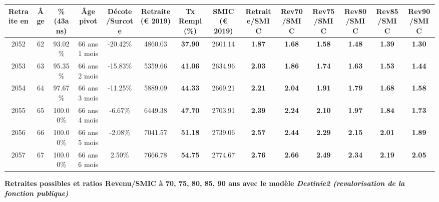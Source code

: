 \begin{adjustbox}{max width=\textwidth} 
\begin{tabular}[htb]{|c|c||c|c|c||c|c||c||c|c|c|c|c|c|} 
\hline 
 Retraite en &  Âge &  \%(43ans) &  Âge pivot &  Décote/Surcote &  Retraite (\euro{} 2019) &  Tx Rempl(\%) &  SMIC (\euro{} 2019) &  Retraite/SMIC &  Rev70/SMIC &  Rev75/SMIC &  Rev80/SMIC &  Rev85/SMIC &  Rev90/SMIC \\ 
\hline \hline 
 2052 &  62 &  93.02\% &  66 ans 1 mois &  -20.42\% &  4860.03 &  {\bf 37.90} &  2601.14 &  {\bf 1.87} &  {\bf 1.68} &  {\bf 1.58} &  {\bf 1.48} &  {\bf 1.39} &  {\bf 1.30} \\ 
\hline 
 2053 &  63 &  95.35\% &  66 ans 2 mois &  -15.83\% &  5359.66 &  {\bf 41.06} &  2634.96 &  {\bf 2.03} &  {\bf 1.86} &  {\bf 1.74} &  {\bf 1.63} &  {\bf 1.53} &  {\bf 1.44} \\ 
\hline 
 2054 &  64 &  97.67\% &  66 ans 3 mois &  -11.25\% &  5889.09 &  {\bf 44.33} &  2669.21 &  {\bf 2.21} &  {\bf 2.04} &  {\bf 1.91} &  {\bf 1.79} &  {\bf 1.68} &  {\bf 1.58} \\ 
\hline 
 2055 &  65 &  100.00\% &  66 ans 4 mois &  -6.67\% &  6449.38 &  {\bf 47.70} &  2703.91 &  {\bf 2.39} &  {\bf 2.24} &  {\bf 2.10} &  {\bf 1.97} &  {\bf 1.84} &  {\bf 1.73} \\ 
\hline 
 2056 &  66 &  100.00\% &  66 ans 5 mois &  -2.08\% &  7041.57 &  {\bf 51.18} &  2739.06 &  {\bf 2.57} &  {\bf 2.44} &  {\bf 2.29} &  {\bf 2.15} &  {\bf 2.01} &  {\bf 1.89} \\ 
\hline 
 2057 &  67 &  100.00\% &  66 ans 6 mois &  2.50\% &  7666.78 &  {\bf 54.75} &  2774.67 &  {\bf 2.76} &  {\bf 2.66} &  {\bf 2.49} &  {\bf 2.34} &  {\bf 2.19} &  {\bf 2.05} \\ 
\hline 
\hline 
\end{tabular} 
\end{adjustbox} 
 
 \vspace{0.1cm} 
{\bf \noindent Retraites possibles et ratios Revenu/SMIC à 70, 75, 80, 85, 90 ans avec le modèle \emph{Destinie2 (revalorisation de la fonction publique)}}  
 
